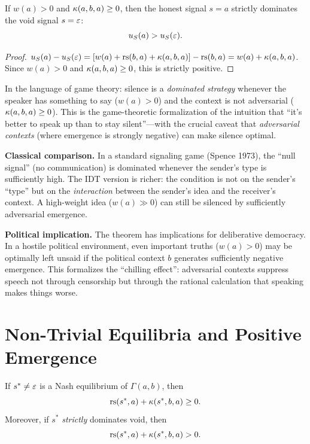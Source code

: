 \begin{theorem}
\label{thm:void-dominated}
If $w(a) > 0$ and $\kappa(a, b, a) \geq 0$, then the honest signal
$s = a$ strictly dominates the void signal $s = \varepsilon$:
\[
u_S(a) > u_S(\varepsilon).
\]
\end{theorem}

\begin{proof}
$u_S(a) - u_S(\varepsilon) = [w(a) + \mathrm{rs}(b,a) + \kappa(a,b,a)] - \mathrm{rs}(b,a) =
w(a) + \kappa(a,b,a)$. Since $w(a) > 0$ and $\kappa(a,b,a) \geq 0$,
this is strictly positive.
\end{proof}

\begin{interpretation}
In the language of game theory: silence is a \emph{dominated strategy}
whenever the speaker has something to say ($w(a) > 0$) and the context is
not adversarial ($\kappa(a,b,a) \geq 0$). This is the game-theoretic
formalization of the intuition that ``it's better to speak up than to stay
silent''---with the crucial caveat that \emph{adversarial contexts} (where
emergence is strongly negative) can make silence optimal.

\textbf{Classical comparison.} In a standard signaling game (Spence 1973),
the ``null signal'' (no communication) is dominated whenever the sender's
type is sufficiently high. The IDT version is richer: the condition is
not on the sender's ``type'' but on the \emph{interaction} between the
sender's idea and the receiver's context. A high-weight idea ($w(a) \gg 0$)
can still be silenced by sufficiently adversarial emergence.

\textbf{Political implication.} The theorem has implications for
deliberative democracy. In a hostile political environment, even
important truths ($w(a) > 0$) may be optimally left unsaid if the
political context $b$ generates sufficiently negative emergence. This
formalizes the ``chilling effect'': adversarial contexts suppress
speech not through censorship but through the rational calculation
that speaking makes things worse.
\end{interpretation}


\section{Non-Trivial Equilibria and Positive Emergence}

\begin{theorem}
\label{thm:nontrivial-equilibria}
If $s^* \neq \varepsilon$ is a Nash equilibrium of $\Gamma(a, b)$, then
\[
\mathrm{rs}(s^*, a) + \kappa(s^*, b, a) \geq 0.
\]
Moreover, if $s^*$ \emph{strictly} dominates void, then
\[
\mathrm{rs}(s^*, a) + \kappa(s^*, b, a) > 0.
\]
\end{theorem}

